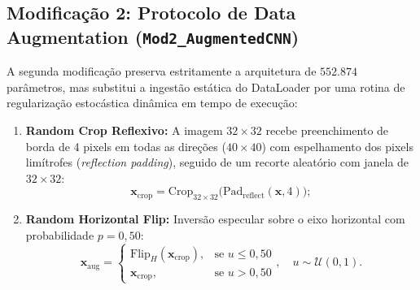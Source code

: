 \documentclass[runningheads]{llncs}
\begin{document}
\subsection{Modifica\c{c}\~{a}o 2: Protocolo de Data Augmentation (\texttt{Mod2\_AugmentedCNN})}
A segunda modifica\c{c}\~{a}o preserva estritamente a arquitetura de $552.874$ par\^{a}metros, mas substitui a ingest\~{a}o est\'{a}tica do DataLoader por uma rotina de regulariza\c{c}\~{a}o estoc\'{a}stica din\^{a}mica em tempo de execu\c{c}\~{a}o:
\begin{enumerate}
    \item \textbf{Random Crop Reflexivo:} A imagem $32 \times 32$ recebe preenchimento de borda de 4 pixels em todas as dire\c{c}\~{o}es ($40 \times 40$) com espelhamento dos pixels lim\'{i}trofes (\textit{reflection padding}), seguido de um recorte aleat\'{o}rio com janela de $32 \times 32$:
    \begin{equation}
        \mathbf{x}_{\text{crop}} = \text{Crop}_{32 \times 32}\Big(\text{Pad}_{\text{reflect}}(\mathbf{x}, 4)\Big);
    \end{equation}
    \item \textbf{Random Horizontal Flip:} Invers\~{a}o especular sobre o eixo horizontal com probabilidade $p = 0{,}50$:
    \begin{equation}
        \mathbf{x}_{\text{aug}} = \begin{cases}
            \text{Flip}_{H}(\mathbf{x}_{\text{crop}}), & \text{se } u \le 0{,}50 \\
            \mathbf{x}_{\text{crop}}, & \text{se } u > 0{,}50
        \end{cases}, \quad u \sim \mathcal{U}(0, 1).
    \end{equation}
\end{enumerate}
\end{document}
